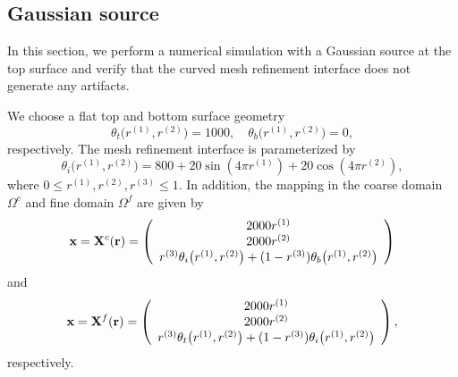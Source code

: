 \subsection{Gaussian source}\label{gaussian_source}
In this section, we perform a numerical simulation with a Gaussian source at the top surface and verify that  the curved mesh refinement interface does not generate any artifacts. 

We choose a flat top and bottom surface geometry 
\begin{equation*}
\theta_t\big(r^{(1)},r^{(2)}\big) = 1000,\quad \theta_b\big(r^{(1)},r^{(2)}\big) = 0,
\end{equation*}
respectively. The mesh refinement interface is parameterized by
\begin{equation}\label{interface_gausian}
\theta_i\big(r^{(1)},r^{(2)}\big) = 800+20\sin(4\pi r^{(1)})+20\cos(4\pi r^{(2)}),
\end{equation}
where $0\leq r^{(1)}, r^{(2)}, r^{(3)}\leq 1$. 
In addition, the mapping in the coarse domain $\Omega^c$ and fine domain $\Omega^f$ are given by 
\[ {\bf x} = {\bf X}^c({\bf r}) = \left(\begin{array}{c}
2000 r^{(1)}\\
2000 r^{(2)}\\
r^{(3)} \theta_i\big(r^{(1)}, r^{(2)}\big) + (1-r^{(3)}) \theta_b\big(r^{(1)},r^{(2)}\big) \end{array}\right) \]
and 
\[ {\bf x} = {\bf X}^f({\bf r}) = \left(\begin{array}{c}
2000 r^{(1)}\\
2000 r^{(2)}\\
r^{(3)}\theta_t\big(r^{(1)},r^{(2)}\big) + (1-r^{(3)})\theta_i\big(r^{(1)},r^{(2)}\big)\end{array}\right), \]
respectively. 
